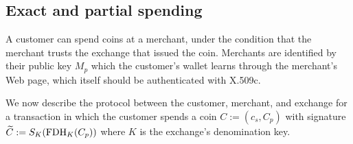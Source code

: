 \documentclass[sigconf, authordraft]{acmart}
\begin{document}
\subsection{Exact and partial spending}

A customer can spend coins at a merchant, under the condition that the
merchant trusts the exchange that issued the coin.
Merchants are identified by their public key $M_p$ which the
customer's wallet learns through the merchant's Web page, which itself
should be authenticated with X.509c.

We now describe the protocol between the customer, merchant, and exchange
for a transaction in which the customer spends a coin $C := (c_s, C_p)$
with signature $\widetilde{C} := S_K(\textrm{FDH}_K(C_p))$
 where $K$ is the exchange's denomination key.

\end{document}
